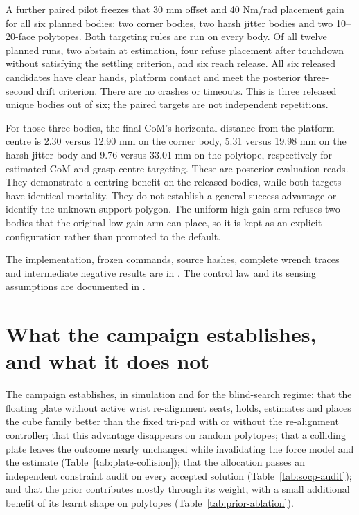 A further paired pilot freezes that 30 mm offset and 40 Nm/rad placement gain for all six planned bodies: two corner bodies, two harsh jitter bodies and two 10--20-face polytopes. Both targeting rules are run on every body. Of all twelve planned runs, two abstain at estimation, four refuse placement after touchdown without satisfying the settling criterion, and six reach release. All six released candidates have clear hands, platform contact and meet the posterior three-second drift criterion. There are no crashes or timeouts. This is three released unique bodies out of six; the paired targets are not independent repetitions.

For those three bodies, the final CoM's horizontal distance from the platform centre is 2.30 versus 12.90 mm on the corner body, 5.31 versus 19.98 mm on the harsh jitter body and 9.76 versus 33.01 mm on the polytope, respectively for estimated-CoM and grasp-centre targeting. These are posterior evaluation reads. They demonstrate a centring benefit on the released bodies, while both targets have identical mortality. They do not establish a general success advantage or identify the unknown support polygon. The uniform high-gain arm refuses two bodies that the original low-gain arm can place, so it is kept as an explicit configuration rather than promoted to the default.

The implementation, frozen commands, source hashes, complete wrench traces and intermediate negative results are in . The control law and its sensing assumptions are documented in .

\section{What the campaign establishes, and what it does not}
\label{sec:geo-limits}

The campaign establishes, in simulation and for the blind-search regime: that the floating plate without active wrist re-alignment seats, holds, estimates and places the cube family better than the fixed tri-pad with or without the re-alignment controller; that this advantage disappears on random polytopes; that a colliding plate leaves the outcome nearly unchanged while invalidating the force model and the estimate (Table~\ref{tab:plate-collision}); that the allocation passes an independent constraint audit on every accepted solution (Table~\ref{tab:socp-audit}); and that the prior contributes mostly through its weight, with a small additional benefit of its learnt shape on polytopes (Table~\ref{tab:prior-ablation}).

